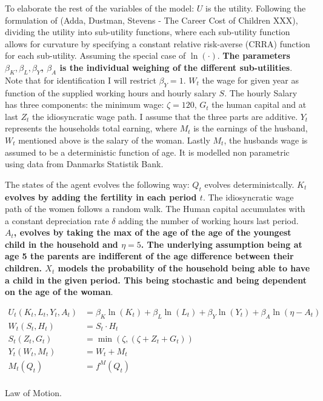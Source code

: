 To elaborate the rest of the variables of the model: $U$ is the utility. Following the formulation of (Adda, Dustman, Stevens - The Career Cost of Children XXX), dividing the utility into sub-utility functions, where each sub-utility function allows for curvature by specifying a constant relative risk-averse (CRRA) function for each sub-utility. Assuming the special case of $\ln(\cdot)$. \textbf{The parameters $\beta_K, \beta_L, \beta_Y$, $\beta_A$ is the individual weighing of the different sub-utilities}. Note that for identification I will restrict $\beta_Y= 1$. $W_t$ the wage for given year as function of the supplied working hours and hourly salary $S$. The hourly Salary has three components: the minimum wage: $\zeta=120$, $G_t$ the human capital and at last $Z_t$ the idiosyncratic wage path. I assume that the three parts are additive. $Y_t$ represents the households total earning, where $M_t$ is the earnings of the husband, $W_t$ mentioned above is the salary of the woman. Lastly $M_t$, the husbands wage is assumed to be a deterministic function of age. It is modelled non parametric using data from Danmarks Statistik Bank.

The states of the agent evolves the following way: $Q_t$ evolves deterministcally. \textbf{$K_t$ evolves by adding the fertility in each period $t$}. The idiosyncratic wage path of the women follows a random walk. The Human capital accumulates with a constant depreciation rate $\delta$ adding the number of working hours last period. \textbf{$A_t$, evolves by taking the max of the age of the age of the youngest child in the household and $\eta=5$. The underlying assumption being at age 5 the parents are indifferent of the age difference between their children. $X_t$ models the probability of the household being able to have a child in the given period. This being stochastic and being dependent on the age of the woman}.

\begin{align}
    U_t(K_t, L_t, Y_t, A_t) &= \beta_K \ln(K_t) + \beta_L \ln(L_t) + \beta_Y \ln(Y_t) + \beta_A \ln(\eta - A_t) \\
    W_t(S_t, H_t) &=S_t \cdot H_t \\
    S_t(Z_t, G_t) &= \min(\zeta, (\zeta + Z_t + G_t))  \\
    Y_t(W_t, M_t) &= W_t + M_t\\
    M_t(Q_t) &= f^M(Q_t) \\
\end{align}


Law of Motion.

